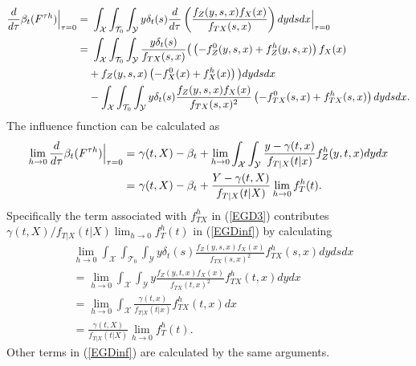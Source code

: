 \documentclass[lettersize, 12pt]{article}
\begin{document}
{\begin{align}
\frac{d}{d \tau}\beta_t(F^{\tau h})\Big|_{\tau = 0} =&\ 
\int_{\mathcal{X}}\int_{\mathcal{T}_0} \int_{\mathcal{Y}} y\delta_t(s) \frac{d}{d \tau} \left( \frac{f_{Z}(y,s,x) f_{X}(x)}{f_{TX}(s,x)}\right) dy dsdx\Big|_{\tau = 0}\notag\\
=&\ 
\int_{\mathcal{X}}\int_{\mathcal{T}_0} \int_{\mathcal{Y}} \frac{y\delta_t(s)}{f_{TX}(s,x)}\big( \left( - f^0_{Z}(y,s,x) + f_{Z}^h(y,s,x) \right) f_X(x) \notag\\
&+ f_{Z}(y,s,x) \left( - f_{X}^0(x) + f_X^h(x)\right) \big)dy dsdx\notag\\
&- \int_{\mathcal{X}}\int_{\mathcal{T}_0} \int_{\mathcal{Y}} y\delta_t(s)  \frac{f_{Z}(y,s,x) f_{X}(x)}{f_{TX}(s,x)^2}\left( -f_{TX}^0(s,x) + f_{TX}^h(s,x)\right) dy dsdx.
\label{EGD3}
\end{align}
The influence function can be calculated as 
\begin{align}
\lim_{h \rightarrow 0}
\frac{d}{d \tau}\beta_t(F^{\tau h})\Big|_{\tau = 0} 
=&\ 
\gamma(t,X) - \beta_t +\lim_{h \rightarrow 0} \int_{\mathcal{X}}\int_{\mathcal{Y}} 
 \frac{y - \gamma(t,x)}{f_{T|X}(t|x)} f_{Z}^h(y,t,x) dy dx \notag \\
=&\ 
\gamma(t,X) - \beta_t +
 \frac{Y - \gamma(t,X)}{f_{T|X}(t|X)} \lim_{h \rightarrow 0} f_{T}^h(t).
 \label{EGDinf}
\end{align}
Specifically the term associated with $f_{TX}^h$ in (\ref{EGD3}) contributes $\gamma(t,X)/f_{T|X}(t|X) \lim_{h\rightarrow 0} f_T^h(t)$ in (\ref{EGDinf}) by calculating 
\begin{align*}
&\lim_{h\rightarrow 0} \int_{\mathcal{X}}\int_{\mathcal{T}_0} \int_{\mathcal{Y}} y\delta_t(s)  \frac{f_{Z}(y,s,x) f_{X}(x)}{f_{TX}(s,x)^2} f_{TX}^h(s,x) dy dsdx
\\
&= \lim_{h\rightarrow 0}  \int_{\mathcal{X}} \int_{\mathcal{Y}} y  \frac{f_{Z}(y,t,x) f_{X}(x)}{f_{TX}(t,x)^2} f_{TX}^h(t,x) dy dx
\\
&=  \lim_{h\rightarrow 0} \int_{\mathcal{X}}   \frac{\gamma(t,x)}{f_{T|X}(t|x)} f_{TX}^h(t,x) dx
\\
&= \frac{\gamma(t,X)}{f_{T|X}(t|X)} \lim_{h\rightarrow 0}  f_{T}^h(t).
\end{align*}
Other terms in (\ref{EGDinf}) are calculated by the same arguments.

}
\end{document}
